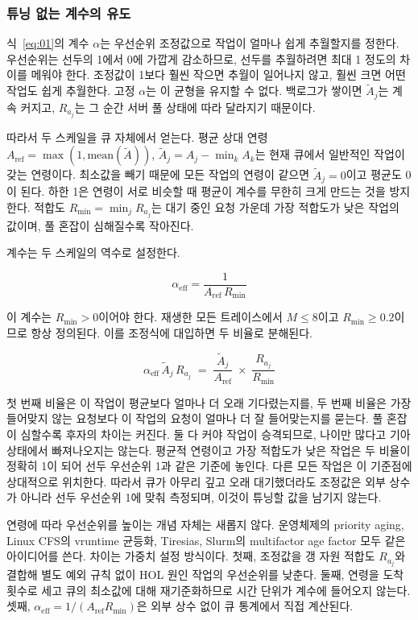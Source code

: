 \documentclass{ieeetj}
\begin{document}
\subsubsection{튜닝 없는 계수의 유도} \label{alphaeff}
식~\eqref{eq:01}의 계수 $\alpha$는 우선순위 조정값으로 작업이 얼마나 쉽게 추월할지를 정한다. 우선순위는 선두의 1에서 0에 가깝게 감소하므로, 선두를 추월하려면 최대 1 정도의 차이를 메워야 한다. 조정값이 1보다 훨씬 작으면 추월이 일어나지 않고, 훨씬 크면 어떤 작업도 쉽게 추월한다. 고정 $\alpha$는 이 균형을 유지할 수 없다. 백로그가 쌓이면 $\tilde A_j$는 계속 커지고, $R_{a_j}$는 그 순간 서버 풀 상태에 따라 달라지기 때문이다.

따라서 두 스케일을 큐 자체에서 얻는다. 평균 상대 연령 $A_{\text{ref}} = \max(1,\text{mean}(\tilde A))$, $\tilde A_j = A_j - \min_k A_k$는 현재 큐에서 일반적인 작업이 갖는 연령이다. 최소값을 빼기 때문에 모든 작업의 연령이 같으면 $\tilde A_j=0$이고 평균도 0이 된다. 하한 1은 연령이 서로 비슷할 때 평균이 계수를 무한히 크게 만드는 것을 방지한다. 적합도 $R_{\min}=\min_j R_{a_j}$는 대기 중인 요청 가운데 가장 적합도가 낮은 작업의 값이며, 풀 혼잡이 심해질수록 작아진다.

계수는 두 스케일의 역수로 설정한다.

\begin{equation}
\alpha_{\text{eff}} = \frac{1}{A_{\text{ref}}\,R_{\min}}
\label{eq:auto-alpha}
\end{equation}

이 계수는 $R_{\min}>0$이어야 한다. 재생한 모든 트레이스에서 $M\le8$이고 $R_{\min}\ge0.2$이므로 항상 정의된다. 이를 조정식에 대입하면 두 비율로 분해된다.

\begin{equation}
\alpha_{\text{eff}}\,\tilde A_j\, R_{a_j} \;=\; \frac{\tilde A_j}{A_{\text{ref}}} \;\times\; \frac{R_{a_j}}{R_{\min}}
\label{eq:alphaeff-define}
\end{equation}

첫 번째 비율은 이 작업이 평균보다 얼마나 더 오래 기다렸는지를, 두 번째 비율은 가장 들어맞지 않는 요청보다 이 작업의 요청이 얼마나 더 잘 들어맞는지를 묻는다. 풀 혼잡이 심할수록 후자의 차이는 커진다. 둘 다 커야 작업이 승격되므로, 나이만 많다고 기아 상태에서 빠져나오지는 않는다. 평균적 연령이고 가장 적합도가 낮은 작업은 두 비율이 정확히 1이 되어 선두 우선순위 1과 같은 기준에 놓인다. 다른 모든 작업은 이 기준점에 상대적으로 위치한다. 따라서 큐가 아무리 깊고 오래 대기했더라도 조정값은 외부 상수가 아니라 선두 우선순위 1에 맞춰 측정되며, 이것이 튜닝할 값을 남기지 않는다.

연령에 따라 우선순위를 높이는 개념 자체는 새롭지 않다. 운영체제의 priority aging, Linux CFS의 vruntime 균등화, Tiresias\cite{gu2019tiresias}, Slurm의 multifactor age factor 모두 같은 아이디어를 쓴다. 차이는 가중치 설정 방식이다. 첫째, 조정값을 갱 자원 적합도 $R_{a_j}$와 결합해 별도 예외 규칙 없이 HOL 원인 작업의 우선순위를 낮춘다. 둘째, 연령을 도착 횟수로 세고 큐의 최소값에 대해 재기준화하므로 시간 단위가 계수에 들어오지 않는다. 셋째, $\alpha_{\text{eff}}=1/(A_{\text{ref}}R_{\min})$은 외부 상수 없이 큐 통계에서 직접 계산된다.
\end{document}
